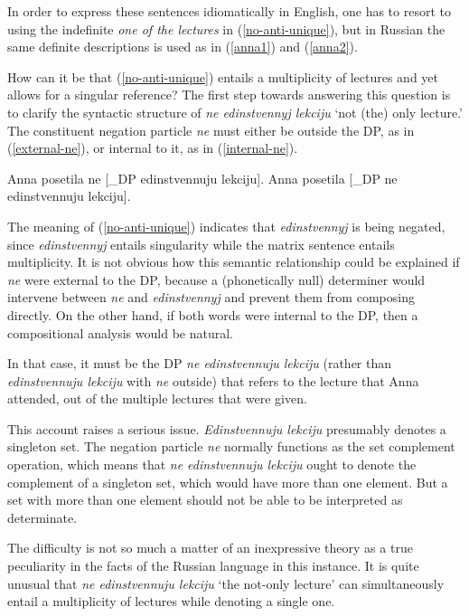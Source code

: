 In order to express these sentences idiomatically in English, one has to resort to using the indefinite \textit{one of the lectures} in (\ref{no-anti-unique}), but in Russian the same definite descriptions is used as in (\ref{anna1}) and (\ref{anna2}).

How can it be that (\ref{no-anti-unique}) entails a multiplicity of lectures and yet allows for a singular reference? The first step towards answering this question is to clarify the syntactic structure of \textit{ne edinstvennyj lekciju} `not (the) only lecture.' The constituent negation particle \textit{ne} must either be outside the DP, as in (\ref{external-ne}), or internal to it, as in (\ref{internal-ne}).

\begin{exe}
	\ex \label{external-ne} Anna posetila ne [_{DP} edinstvennuju lekciju].
	\ex \label{internal-ne} Anna posetila [_{DP} ne edinstvennuju lekciju].
\end{exe}

The meaning of (\ref{no-anti-unique}) indicates that \textit{edinstvennyj} is being negated, since \textit{edinstvennyj} entails singularity while the matrix sentence entails multiplicity. It is not obvious how this semantic relationship could be explained if \textit{ne} were external to the DP, because a (phonetically null) determiner would intervene between \textit{ne} and \textit{edinstvennyj} and prevent them from composing directly. On the other hand, if both words were internal to the DP, then a compositional analysis would be natural.

In that case, it must be the DP \textit{ne edinstvennuju lekciju} (rather than \textit{edinstvennuju lekciju} with \textit{ne} outside) that refers to the lecture that Anna attended, out of the multiple lectures that were given.

This account raises a serious issue. \textit{Edinstvennuju lekciju} presumably denotes a singleton set. The negation particle \textit{ne} normally functions as the set complement operation, which means that \textit{ne edinstvennuju lekciju} ought to denote the complement of a singleton set, which would have more than one element. But a set with more than one element should not be able to be interpreted as determinate.

The difficulty is not so much a matter of an inexpressive theory as a true peculiarity in the facts of the Russian language in this instance. It is quite unusual that \textit{ne edinstvennuju lekciju} `the not-only lecture' can simultaneously entail a multiplicity of lectures while denoting a single one.

